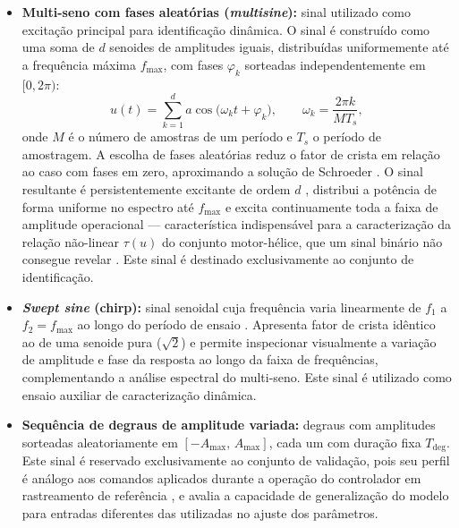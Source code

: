 \begin{itemize}

    \item \textbf{Multi-seno com fases aleatórias (\textit{multisine}):} sinal utilizado como excitação principal para identificação dinâmica. O sinal é construído como uma soma de $d$ senoides de amplitudes iguais, distribuídas uniformemente até a frequência máxima $f_\text{max}$, com fases $\varphi_k$ sorteadas independentemente em $[0, 2\pi)$:
    \begin{equation}
        u(t) = \sum_{k=1}^{d} a\cos\!\bigl(\omega_k t + \varphi_k\bigr), \qquad \omega_k = \frac{2\pi k}{M T_s}, \label{eq:multisine}
    \end{equation}
    onde $M$ é o número de amostras de um período e $T_s$ o período de amostragem. A escolha de fases aleatórias reduz o fator de crista em relação ao caso com fases em zero, aproximando a solução de Schroeder \cite{ljung1999}. O sinal resultante é persistentemente excitante de ordem $d$ \cite{ljung1999}, distribui a potência de forma uniforme no espectro até $f_\text{max}$ e excita continuamente toda a faixa de amplitude operacional — característica indispensável para a caracterização da relação não-linear $\tau(u)$ do conjunto motor-hélice, que um sinal binário não consegue revelar \cite[p.~422]{ljung1999}. Este sinal é destinado exclusivamente ao conjunto de identificação.

    \item \textbf{\textit{Swept sine} (chirp):} sinal senoidal cuja frequência varia linearmente de $f_1$ a $f_2 = f_\text{max}$ ao longo do período de ensaio \cite[Sec.~13.3]{ljung1999}. Apresenta fator de crista idêntico ao de uma senoide pura ($\sqrt{2}$) e permite inspecionar visualmente a variação de amplitude e fase da resposta ao longo da faixa de frequências, complementando a análise espectral do multi-seno. Este sinal é utilizado como ensaio auxiliar de caracterização dinâmica.

    \item \textbf{Sequência de degraus de amplitude variada:} degraus com amplitudes sorteadas aleatoriamente em $[-A_\text{max},\, A_\text{max}]$, cada um com duração fixa $T_\text{deg}$. Este sinal é reservado exclusivamente ao conjunto de validação, pois seu perfil é análogo aos comandos aplicados durante a operação do controlador em rastreamento de referência \cite[Sec.~13.2]{ljung1999}, e avalia a capacidade de generalização do modelo para entradas diferentes das utilizadas no ajuste dos parâmetros.

\end{itemize}

